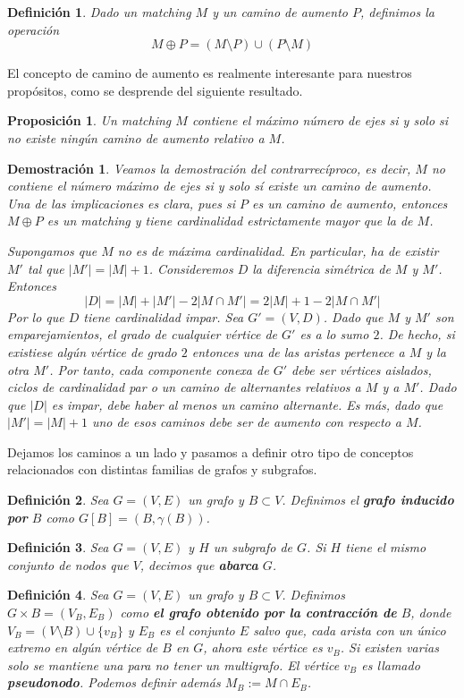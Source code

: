 \documentclass[twoside,a4paper,openright,12pt,tikz]{book}
\newtheorem{defi}{Definici\'on}[section]
\newtheorem{prop}{Proposici\'on}[section]
\newtheorem*{dem}{Demostración}
\begin{document}
\begin{defi} 
Dado un matching $M$ y un camino de aumento $P$, definimos la operación 
$$
M\oplus P = (M\setminus P)\cup (P\setminus M)
$$
\end{defi}
El concepto de camino de aumento es realmente interesante para nuestros propósitos, como se desprende del siguiente resultado.
\begin{prop}
Un matching $M$ contiene el máximo número de ejes si y solo si no existe ningún camino de aumento relativo a $M$.
\end{prop}
\begin{dem}
Veamos la demostración del contrarrecíproco, es decir, $M$ no contiene el número máximo de ejes si y solo sí existe un camino de aumento. Una de las implicaciones es clara, pues si $P$ es un camino de aumento, entonces $M\oplus P$ es un matching y tiene cardinalidad estrictamente mayor que la de $M$. 

Supongamos que $M$ no es de máxima cardinalidad. En particular, ha de existir $M'$ tal que $|M'| = |M| +1$. Consideremos $D$ la diferencia simétrica de $M$ y $M'$. Entonces
$$
|D| = |M|+|M'| -2|M\cap M'| = 2|M|+1-2|M\cap M'|
$$
Por lo que $D$ tiene cardinalidad impar. Sea $G' = (V,D)$. Dado que $M$ y $M'$ son emparejamientos, el grado de cualquier vértice de $G'$ es a lo sumo $2$. De hecho, si existiese algún vértice de grado $2$ entonces una de las aristas pertenece a $M$ y la otra $M'$. Por tanto, cada componente conexa de $G'$ debe ser vértices aislados, ciclos de cardinalidad par o un camino de alternantes relativos a $M$ y a $M'$. Dado que $|D|$ es impar, debe haber al menos un camino alternante. Es más, dado que $|M'|=|M|+1$ uno de esos caminos debe ser de aumento con respecto a $M$.
\end{dem}

Dejamos los caminos a un lado y pasamos a definir otro tipo de conceptos relacionados con distintas familias de grafos y subgrafos.
\begin{defi}
Sea $G=(V,E)$ un grafo y $B \subset V$. Definimos el \textbf{grafo inducido por }$B$ como $G[B] = (B,\gamma(B))$.  
\end{defi}
\begin{defi}
Sea $G=(V,E)$ y $H$ un subgrafo de $G$. Si $H$ tiene el mismo conjunto de nodos que $V$, decimos que \textbf{abarca }$G$.
\end{defi}
\begin{defi}
Sea $G=(V,E)$ un grafo y $B\subset V$. Definimos $G \times B=(V_B,E_B)$ como \textbf{el grafo obtenido por la contracción de} $B$, donde $V_B = (V \setminus B)\cup \{v_B\}$ y $E_B$ es el conjunto $E$ salvo que, cada arista con un único extremo en algún vértice de $B$ en $G$, ahora este vértice es $v_B$. Si existen varias solo se mantiene una para no tener un multigrafo. El vértice $v_B$ es llamado \textbf{pseudonodo}. Podemos definir además $M_B:= M\cap E_B$.
\end{defi}
\end{document}
